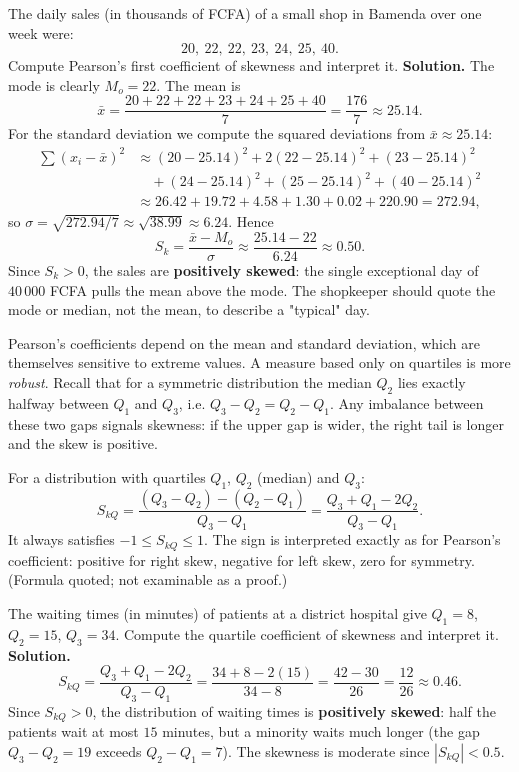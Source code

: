 \documentclass[11pt]{article}
\newcounter{popsec}
\newcounter{popsub}
\newcommand{\courssub}[1]{%
  \stepcounter{popsub}%
  \par\vspace{9pt}\noindent{\popxbold\fontsize{11.5}{13}\selectfont\color{popink}{\color{poporange}\thepopsec.\thepopsub}\hspace{6pt}#1}\par\nopagebreak\vspace{4pt}
}
\begin{document}
\begin{exoresolu}
The daily sales (in thousands of FCFA) of a small shop in Bamenda over one week were:
\[ 20,\ 22,\ 22,\ 23,\ 24,\ 25,\ 40. \]
Compute Pearson's first coefficient of skewness and interpret it.
\tcblower
\textbf{Solution.} The mode is clearly $M_o = 22$. The mean is
\[ \bar{x} = \frac{20 + 22 + 22 + 23 + 24 + 25 + 40}{7} = \frac{176}{7} \approx 25.14. \]
For the standard deviation we compute the squared deviations from $\bar{x} \approx 25.14$:
\begin{align*}
\sum (x_i - \bar{x})^2 &\approx (20-25.14)^2 + 2(22-25.14)^2 + (23-25.14)^2 \\
&\quad + (24-25.14)^2 + (25-25.14)^2 + (40-25.14)^2 \\
&\approx 26.42 + 19.72 + 4.58 + 1.30 + 0.02 + 220.90 = 272.94,
\end{align*}
so $\sigma = \sqrt{272.94/7} \approx \sqrt{38.99} \approx 6.24$. Hence
\[ S_k = \frac{\bar{x} - M_o}{\sigma} \approx \frac{25.14 - 22}{6.24} \approx 0.50. \]
Since $S_k > 0$, the sales are \textbf{positively skewed}: the single exceptional day of $40\,000$ FCFA pulls the mean above the mode. The shopkeeper should quote the mode or median, not the mean, to describe a "typical" day.
\end{exoresolu}

\courssub{Quartile Coefficient of Skewness}

Pearson's coefficients depend on the mean and standard deviation, which are themselves sensitive to extreme values. A measure based only on quartiles is more \emph{robust}. Recall that for a symmetric distribution the median $Q_2$ lies exactly halfway between $Q_1$ and $Q_3$, i.e. $Q_3 - Q_2 = Q_2 - Q_1$. Any imbalance between these two gaps signals skewness: if the upper gap is wider, the right tail is longer and the skew is positive.

\begin{propriete}
For a distribution with quartiles $Q_1$, $Q_2$ (median) and $Q_3$:
\[ S_{kQ} = \frac{(Q_3 - Q_2) - (Q_2 - Q_1)}{Q_3 - Q_1} = \frac{Q_3 + Q_1 - 2Q_2}{Q_3 - Q_1}. \]
It always satisfies $-1 \le S_{kQ} \le 1$. The sign is interpreted exactly as for Pearson's coefficient: positive for right skew, negative for left skew, zero for symmetry. (Formula quoted; not examinable as a proof.)
\end{propriete}

\begin{exoresolu}
The waiting times (in minutes) of patients at a district hospital give $Q_1 = 8$, $Q_2 = 15$, $Q_3 = 34$. Compute the quartile coefficient of skewness and interpret it.
\tcblower
\textbf{Solution.}
\[ S_{kQ} = \frac{Q_3 + Q_1 - 2Q_2}{Q_3 - Q_1} = \frac{34 + 8 - 2(15)}{34 - 8} = \frac{42 - 30}{26} = \frac{12}{26} \approx 0.46. \]
Since $S_{kQ} > 0$, the distribution of waiting times is \textbf{positively skewed}: half the patients wait at most $15$ minutes, but a minority waits much longer (the gap $Q_3 - Q_2 = 19$ exceeds $Q_2 - Q_1 = 7$). The skewness is moderate since $|S_{kQ}| < 0.5$.
\end{exoresolu}
\end{document}
